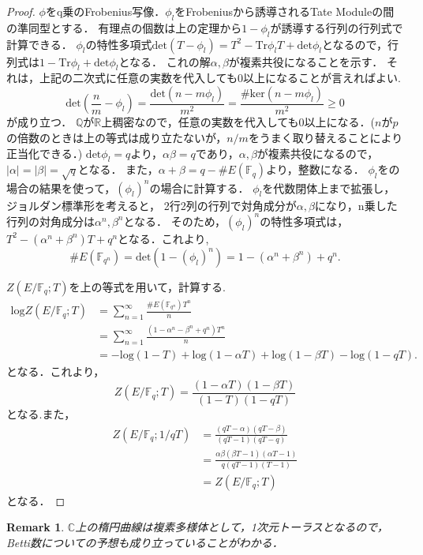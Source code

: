 \documentclass{ujarticle}
\newtheorem*{rem}{Remark}
\begin{document}
\begin{proof}
 $\phi$をq乗のFrobenius写像．$\phi_l$をFrobeniusから誘導されるTate Moduleの間の準同型とする．
 有理点の個数は上の定理から$1 - \phi_l$が誘導する行列の行列式で計算できる．
 $\phi_l$の特性多項式$\mathrm{det}(T - \phi_l)=T^2 -\mathrm{Tr}\phi_l T+ \mathrm{det}\phi_l$となるので，行列式は$1-\mathrm{Tr}\phi_l+ \mathrm{det}\phi_l$となる．
 これの解$\alpha,\beta$が複素共役になることを示す．
 それは，上記の二次式に任意の実数を代入しても0以上になることが言えればよい.
 \begin{equation*}
  \mathrm{det}(\frac{n}{m} - \phi_l)=\frac{\mathrm{det}(n -m \phi_l)}{m^2}
  = \frac{\#\mathrm{ker}(n -m \phi_l)}{m^2} \ge 0
\end{equation*}
が成り立つ．
$\mathbb{Q}$が$\mathbb{R}$上稠密なので，任意の実数を代入しても0以上になる．($n$が$p$の倍数のときは上の等式は成り立たないが，$n/m$をうまく取り替えることにより正当化できる．)
$\mathrm{det}\phi_l=q$より，$\alpha \beta=q$であり，$\alpha,\beta$が複素共役になるので，$|\alpha|=|\beta|=\sqrt{q}$となる．
また，$\alpha + \beta=q -\#E(\mathbb{F}_q)$より，整数になる．
$\phi_l$をの場合の結果を使って，$(\phi_l)^n$の場合に計算する．
$\phi_l$を代数閉体上まで拡張し，ジョルダン標準形を考えると，
2行2列の行列で対角成分が$\alpha,\beta$になり，n乗した行列の対角成分は$\alpha^n,\beta^n$となる．
そのため，$(\phi_l)^n$の特性多項式は，$T^2-(\alpha^n + \beta^n)T +q^n$となる．これより,
\begin{equation*}
  \#E(\mathbb{F}_{q^n})=\mathrm{det}(1- (\phi_l)^n)=1-(\alpha^n + \beta^n) +q^n.
\end{equation*}

$Z(E/\mathbb{F}_q;T)$を上の等式を用いて，計算する.
\begin{align*}
  \mathrm{log}Z(E/\mathbb{F}_q;T) &= \sum_{n=1}^{\infty} \frac{\# E(\mathbb{F}_{q^n})T^n}{n} \\
  &= \sum_{n=1}^{\infty} \frac{(1 - \alpha^n -\beta^n + q^n)T^n}{n} \\
  &= -\mathrm{log}(1-T) + \mathrm{log}(1- \alpha T)+ \mathrm{log}(1- \beta T) - \mathrm{log}(1 -qT).
\end{align*}
となる．これより，
\begin{equation*}
 Z(E/\mathbb{F}_q;T)=\frac{(1- \alpha T)(1- \beta T)}{(1-T)(1-qT)}
\end{equation*}
となる.また，
\begin{align*}
  Z(E/\mathbb{F}_q;1/qT) &= \frac{(qT -\alpha)(qT -\beta)}{(q T - 1)(qT -q)} \\
  &= \frac{\alpha \beta(\beta T - 1)(\alpha T - 1)}{q(q T - 1)(T -1)}　\\
  &= Z(E/\mathbb{F}_q;T)
\end{align*}
となる．
\end{proof}
\begin{rem}
 $\mathbb{C}$上の楕円曲線は複素多様体として，1次元トーラスとなるので，
 Betti数についての予想も成り立っていることがわかる．
\end{rem}
\end{document}
